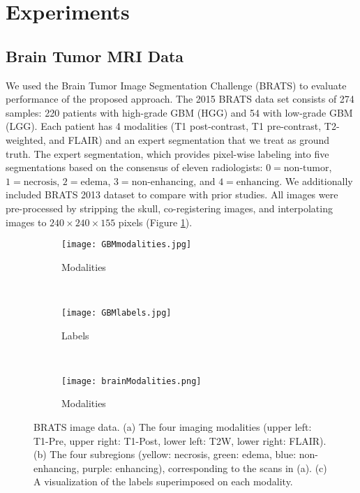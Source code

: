 \documentclass{llncs}
\begin{document}


\section{Experiments}
\subsection{Brain Tumor MRI Data}
We used the Brain Tumor Image Segmentation Challenge (BRATS)\cite{brats} to evaluate performance of the proposed approach.  The 2015 BRATS data set consists of 274 samples: 220 patients with high-grade GBM (HGG) and 54 with low-grade GBM (LGG).  Each patient has 4 modalities (T1 post-contrast, T1 pre-contrast, T2-weighted, and FLAIR) and an expert segmentation that we treat as ground truth. The expert segmentation, which provides pixel-wise labeling into five segmentations based on the consensus of eleven radiologists: $0 = \text{non-tumor}$, $1 = \text{necrosis}$, $2 = \text{edema}$, $3 = \text{non-enhancing}$, and $4 = \text{enhancing}$. We additionally included BRATS 2013 dataset to compare with prior studies. All images were pre-processed by stripping the skull, co-registering images, and interpolating images to $240 \times 240 \times 155$ pixels (Figure \ref{fig:data}).
\begin{figure}[htb]
	\centering
	\begin{subfigure}[h]{0.23\textwidth}
		\texttt{[image: GBMmodalities.jpg]}
		\caption{Modalities}
	\end{subfigure}
	~
	\begin{subfigure}[h]{0.23\textwidth}
		\texttt{[image: GBMlabels.jpg]}
		\caption{Labels}
	\end{subfigure}
	~
	\begin{subfigure}[h]{0.23\textwidth}
		\texttt{[image: brainModalities.png]}
		\caption{Modalities}
	\end{subfigure}
	\caption{{BRATS image data.} \small{(a) The four imaging modalities (upper left: T1-Pre, upper right: T1-Post, lower left: T2W, lower right: FLAIR).  (b) The four subregions (yellow: necrosis, green: edema, blue: non-enhancing, purple: enhancing), corresponding to the scans in (a).  (c)  A visualization of the labels superimposed on each modality.}}
	\label{fig:data}
\end{figure}
\end{document}
